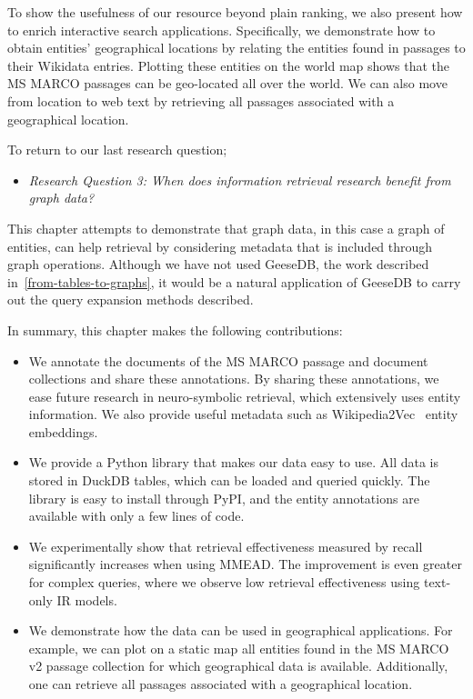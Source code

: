 To show the usefulness of our resource beyond plain ranking, we also present how to enrich interactive search applications. Specifically, we demonstrate how to obtain entities' geographical locations by relating the entities found in passages to their Wikidata entries. Plotting these entities on the world map shows that the MS MARCO passages can be geo-located all over the world.
We can also move from location to web text by retrieving all passages associated with a geographical location.

To return to our last research question; 
\begin{itemize}
	\item \emph{Research Question 3: When does information retrieval research benefit from graph data?} 
\end{itemize}   
This chapter attempts to demonstrate that graph data, in this case a graph of entities, can help retrieval by considering metadata that is included through graph operations. Although we have not used GeeseDB, the work described in~\cref{from-tables-to-graphs}, it would be a natural application of GeeseDB to carry out the query expansion methods described.

In summary, this chapter makes the following contributions:
 \begin{itemize}
	\item We annotate the documents of the MS MARCO passage and document collections and share these annotations. By sharing these annotations, we ease future research in neuro-symbolic retrieval, which extensively uses entity information. We also provide useful metadata such as Wikipedia2Vec~\citep{wikipedia2vec} entity embeddings. 
	\item We provide a Python library that makes our data easy to use. All data is stored in DuckDB tables, which can be loaded and queried quickly. The library is easy to install through PyPI, and the entity annotations are available with only a few lines of code.
	\item We experimentally show that retrieval effectiveness measured by recall significantly increases when using MMEAD. The improvement is even greater for complex queries, where we observe low retrieval effectiveness using text-only IR models.
	\item We demonstrate how the data can be used in geographical applications. For example, we can plot on a static map all entities found in the MS MARCO v2 passage collection for which geographical data is available. Additionally, one can retrieve all passages associated with a geographical location.  
\end{itemize}


